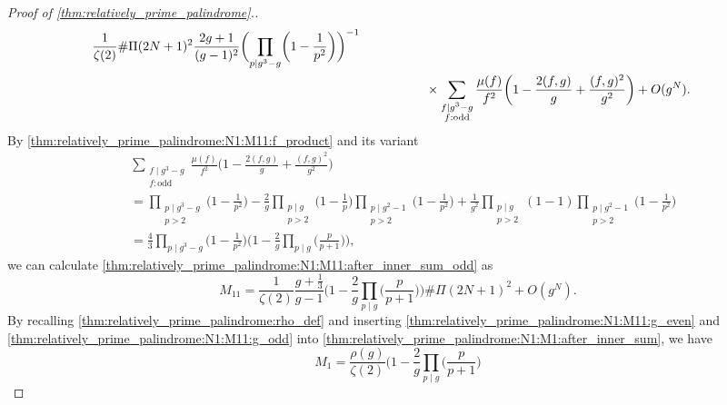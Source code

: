 \documentclass{amsart}
\theoremstyle{plain}
\theoremstyle{definition}
\begin{document}
\begin{proof}[Proof of \cref{thm:relatively_prime_palindrome}.]
\begin{equation}
\begin{aligned}
\frac{1}{\zeta(2)}
\#\Pi(2N+1)^{2}
\frac{2g+1}{(g-1)^{2}}
\biggl(\prod_{p\mid g^{3}-g}\biggl(1-\frac{1}{p^{2}}\biggr)\biggr)^{-1}\\
&\hspace{0.15\textwidth}
\times
\sum_{\substack{
f\mid g^{3}-g\\
f:\text{odd}
}}
\frac{\mu(f)}{f^{2}}
\biggl(1-\frac{2(f,g)}{g}+\frac{(f,g)^{2}}{g^{2}}\biggr)
+O(g^{N}).
\end{aligned}
\end{equation}
By \cref{thm:relatively_prime_palindrome:N1:M11:f_product} and its variant
\begin{equation}
\begin{aligned}
&\sum_{\substack{
f\mid g^{3}-g\\
f:\text{odd}
}}
\frac{\mu(f)}{f^{2}}
\biggl(1-\frac{2(f,g)}{g}+\frac{(f,g)^{2}}{g^{2}}\biggr)\\
&=
\prod_{\substack{
p\mid g^{3}-g\\
p>2
}}\biggl(1-\frac{1}{p^{2}}\biggr)
-
\frac{2}{g}
\prod_{\substack{
p\mid g\\
p>2
}}
\biggl(1-\frac{1}{p}\biggr)
\prod_{\substack{
p\mid g^{2}-1\\
p>2
}}
\biggl(1-\frac{1}{p^{2}}\biggr)
+
\frac{1}{g^{2}}
\prod_{\substack{
p\mid g\\
p>2
}}
(1-1)
\prod_{\substack{
p\mid g^{2}-1\\
p>2
}}
\biggl(1-\frac{1}{p^{2}}\biggr)\\
&=
\frac{4}{3}
\prod_{p\mid g^{3}-g}\biggl(1-\frac{1}{p^{2}}\biggr)
\biggl(
1-\frac{2}{g}\prod_{p\mid g}\biggl(\frac{p}{p+1}\biggr)
\biggr),
\end{aligned}
\end{equation}
we can calculate \cref{thm:relatively_prime_palindrome:N1:M11:after_inner_sum_odd} as
\begin{equation}
\label{thm:relatively_prime_palindrome:N1:M11:g_odd}
M_{11}
=
\frac{1}{\zeta(2)}
\frac{g+\frac{1}{3}}{g-1}
\biggl(
1-\frac{2}{g}\prod_{p\mid g}\biggl(\frac{p}{p+1}\biggr)
\biggr)
\#\Pi(2N+1)^{2}
+
O(g^{N}).
\end{equation}
By recalling \cref{thm:relatively_prime_palindrome:rho_def}
and inserting
\cref{thm:relatively_prime_palindrome:N1:M11:g_even}
and \cref{thm:relatively_prime_palindrome:N1:M11:g_odd}
into \cref{thm:relatively_prime_palindrome:N1:M1:after_inner_sum},
we have
\begin{equation}
\label{thm:relatively_prime_palindrome:N1:M1}
M_{1}
=
\frac{\rho(g)}{\zeta(2)}
\biggl(
1-\frac{2}{g}\prod_{p\mid g}\biggl(\frac{p}{p+1}\biggr)

\end{equation}
\end{proof}
\end{document}
